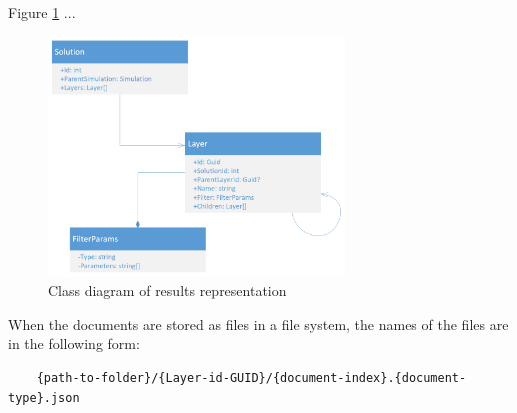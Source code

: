 

Figure \ref{fig:results-class-diagram} ...



\begin{figure}[H]
    \centering
    \includegraphics[width=0.7\textwidth]{figures/chapter-data-management/results-class-diagram}
    \decoRule
    \caption{Class diagram of results representation}
    \label{fig:results-class-diagram}
\end{figure}


When the documents are stored as files in a file system, the names of the files are in the following form:
\begin{verbatim}
    {path-to-folder}/{Layer-id-GUID}/{document-index}.{document-type}.json
\end{verbatim}